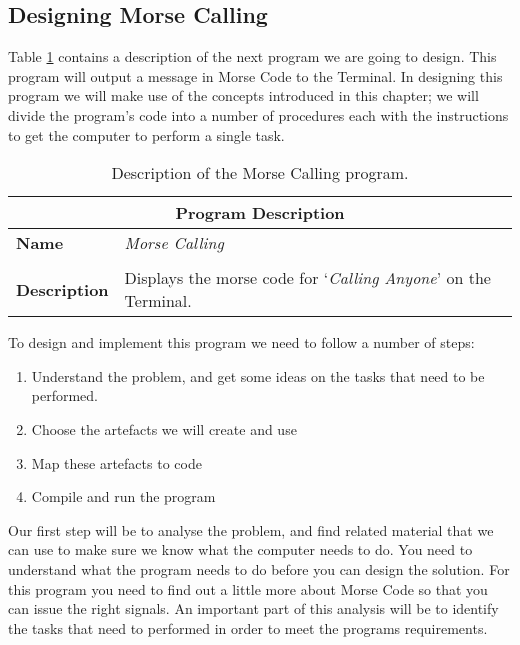 \subsection{Designing Morse Calling} %
\label{sub:designing_morse_calling}

Table \ref{tbl:procedure-decl-morse_calling} contains a description of the next program we are going to design. This program will output a message in Morse Code to the Terminal. In designing this program we will make use of the concepts introduced in this chapter; we will divide the program's code into a number of procedures each with the instructions to get the computer to perform a single task.

\begin{table}[h]
\centering
\begin{tabular}{l|p{10cm}}
  \hline
  \multicolumn{2}{c}{\textbf{Program Description}} \\
  \hline
  \textbf{Name} & \emph{Morse Calling} \\
  \\
  \textbf{Description} & Displays the morse code for `\emph{Calling Anyone}' on the Terminal. \\
  \hline
\end{tabular}
\caption{Description of the Morse Calling program.}
\label{tbl:procedure-decl-morse_calling}
\end{table}

To design and implement this program we need to follow a number of steps:
\begin{enumerate}
  \item Understand the problem, and get some ideas on the tasks that need to be performed.
  \item Choose the artefacts we will create and use
  \item Map these artefacts to code
  \item Compile and run the program
\end{enumerate}

Our first step will be to analyse the problem, and find related material that we can use to make sure we know what the computer needs to do. You need to understand what the program needs to do before you can design the solution. For this program you need to find out a little more about Morse Code so that you can issue the right signals. An important part of this analysis will be to identify the tasks that need to performed in order to meet the programs requirements.

